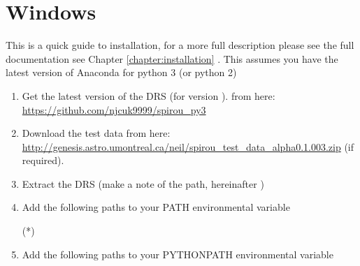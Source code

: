 \section{Windows}



\noindent This is a quick guide to installation, for a more full description please \ifquickguide see the full documentation \else see Chapter \ref{chapter:installation} \fi. This assumes you have the latest version of Anaconda for python 3 (or python 2)


\begin{enumerate}

\item Get the latest version of the DRS (for \instrument version \MyCodeVersion). from here: \url{https://github.com/njcuk9999/spirou_py3}

\item Download the test data from here: \url{http://genesis.astro.umontreal.ca/neil/spirou_test_data_alpha0.1.003.zip} (if required).

\item Extract the DRS (make a note of the path, hereinafter \InstallDIR)

\item Add the following paths to your PATH environmental variable
\begin{textbox}[title={In "Enviromental Variables"}]
(*\InstallDIR*)\bin\;
\end{textbox}

\item Add the following paths to your PYTHONPATH environmental variable
\begin{textbox}[title={In "Enviromental Variables"}]
\end{textbox}


\end{enumerate}

